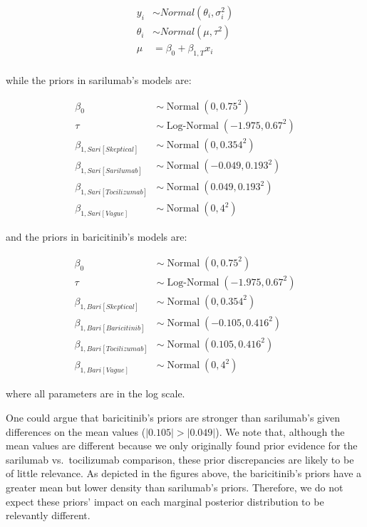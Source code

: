 \documentclass[
  12pt,
]{article}
\begin{document}
\begin{align*}
y_i & \sim Normal(\theta_i, \sigma_i^2)\\
\theta_i & \sim Normal(\mu, \tau^2)\\
\mu &= \beta_0 + \beta_{1, T} x_i\\
\end{align*}

while the priors in sarilumab's models are:

\begin{align*}
\beta_0 & \sim \operatorname{Normal}(0, 0.75^2)\\
\tau & \sim \operatorname{Log-Normal}(-1.975, 0.67^2)\\
\beta_{1, Sari[Skeptical]} & \sim \operatorname{Normal}(0, 0.354^2)\\
\beta_{1, Sari[Sarilumab]} & \sim \operatorname{Normal}(-0.049, 0.193^2)\\
\beta_{1, Sari[Tocilizumab]} & \sim \operatorname{Normal}(0.049, 0.193^2)\\
\beta_{1, Sari[Vague]} & \sim \operatorname{Normal}(0, 4^2)
\end{align*}

and the priors in baricitinib's models are:

\begin{align*}
\beta_0 & \sim \operatorname{Normal}(0, 0.75^2)\\
\tau & \sim \operatorname{Log-Normal}(-1.975, 0.67^2)\\
\beta_{1, Bari[Skeptical]} & \sim \operatorname{Normal}(0, 0.354^2)\\
\beta_{1, Bari[Baricitinib]} & \sim \operatorname{Normal}(-0.105, 0.416^2)\\
\beta_{1, Bari[Tocilizumab]} & \sim \operatorname{Normal}(0.105, 0.416^2)\\
\beta_{1, Bari[Vague]} & \sim \operatorname{Normal}(0, 4^2)
\end{align*}

where all parameters are in the log scale.

One could argue that baricitinib's priors are stronger than sarilumab's
given differences on the mean values (\(|0.105| > |0.049|\)). We note
that, although the mean values are different because we only originally
found prior evidence for the sarilumab vs.~tocilizumab comparison, these
prior discrepancies are likely to be of little relevance. As depicted in
the figures above, the baricitinib's priors have a greater mean but
lower density than sarilumab's priors. Therefore, we do not expect these
priors' impact on each marginal posterior distribution to be relevantly
different.
\end{document}

